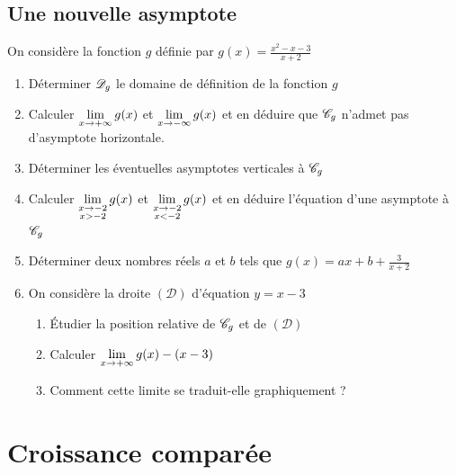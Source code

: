 \documentclass[oneside,12pt]{book}          %
\begin{document}
\subsection{Une nouvelle asymptote}
On considère la fonction $g$ définie par $g(x)=\frac{x^2-x-3}{x+2}$
\begin{enumerate}
    \item Déterminer ${\mathscr{D}}_g$ le domaine de définition de la fonction $g$
    \item Calculer ${\lim\limits_{x\to +\infty}}\, g(x)$ et ${\lim\limits_{\substack{x\to-\infty}}}\,g(x)$ et en déduire que ${\mathscr{C}}_g$ n'admet pas d'asymptote horizontale.
    \item Déterminer les éventuelles asymptotes verticales à ${\mathscr{C}}_g$
    \item Calculer ${\lim\limits_{\substack{x\to-2\\x>-2}}}\,g(x)$ et ${\lim\limits_{\substack{x\to-2\\x<-2}}}\,g(x)$ et en déduire l'équation d'une asymptote à ${\mathscr{C}}_g$
    \item Déterminer deux nombres réels $a$ et $b$ tels que $g(x)=ax+b+\frac{3}{x+2}$
    \item On considère la droite $(\mathcal{D})$ d'équation $y=x-3$
    \begin{enumerate}
        \item Étudier la position relative de ${\mathscr{C}}_g$ et de $(\mathcal{D})$
        \item Calculer ${\lim\limits_{x\to +\infty}}\, g(x)-(x-3)$
        \item Comment cette limite se traduit-elle graphiquement ?
	\end{enumerate}
\end{enumerate}
    


\section{Croissance comparée}
\end{document}
